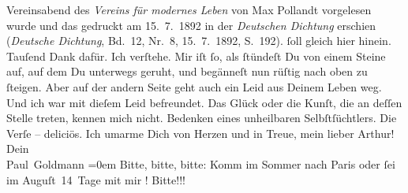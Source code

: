 \begin{ledgroupsized}[t]{13cm}
{{{                  Vereinsabend des \emph{Vereins für modernes Leben}
                  von Max Pollandt vorgelesen wurde und das
                  gedruckt am 15. 7. 1892 in der \emph{Deutschen Dichtung} erschien (\emph{Deutsche Dichtung}, Bd. 12, Nr. 8,
                        15. 7. 1892, S. 192).}}}\label{K_L02697-h} ſoll gleich hier hinein.
               Tauſend Dank dafür. Ich verſtehe. Mir iſt ſo, als ſtündeſt Du von einem Steine auf,
               auf dem Du unterwegs geruht, und begänneſt nun rüſtig nach oben zu ſteigen. Aber auf
               der andern Seite geht auch ein  Leid aus Deinem
               Leben weg. Und ich war mit dieſem Leid befreundet. Das Glück oder die Kunſt, die an
               deſſen Stelle treten, kennen mich nicht. Bedenken eines unheilbaren
               Selbſtſüchtlers.\pend
           \pstart
           Die Verſe – deliciös.\pend
           \pstart
           Ich umarme Dich von Herzen und in Treue, mein lieber Arthur!\pend
           \pstart
           Dein {\\[\baselineskip]}\spacefill\mbox{Paul Goldmann}\pend
           \leftskip=0em{}\pstart
           \noindent{}{\pb}Bitte, bitte, bitte: Komm im Sommer nach Paris oder ſei im Auguſt 14 Tage mit mir \label{K_L02697-1v}\label{K_L02697-1h}! Bitte!!!\pend
           
         
         \endnumbering{}\end{ledgroupsized}  \newcommand{\dateiname}{L02697}\newcommand{\titel}{Paul Goldmann an Arthur Schnitzler, 23. 4. [1892]}\newcommand{\editorInnen}{Martin Anton Müller und Laura Untner}
      